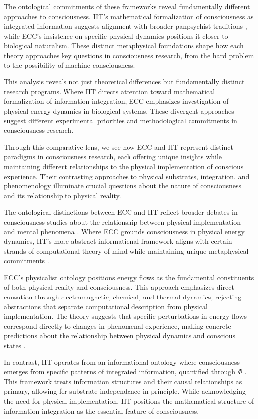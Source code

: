 \begin{refsection}
The ontological commitments of these frameworks reveal fundamentally different approaches to consciousness. IIT's mathematical formalization of consciousness as integrated information suggests alignment with broader panpsychist traditions \cite{Chalmers2015}, while ECC's insistence on specific physical dynamics positions it closer to biological naturalism. These distinct metaphysical foundations shape how each theory approaches key questions in consciousness research, from the hard problem to the possibility of machine consciousness.

This analysis reveals not just theoretical differences but fundamentally distinct research programs. Where IIT directs attention toward mathematical formalization of information integration, ECC emphasizes investigation of physical energy dynamics in biological systems. These divergent approaches suggest different experimental priorities and methodological commitments in consciousness research.

Through this comparative lens, we see how ECC and IIT represent distinct paradigms in consciousness research, each offering unique insights while maintaining different relationships to the physical implementation of conscious experience. Their contrasting approaches to physical substrates, integration, and phenomenology illuminate crucial questions about the nature of consciousness and its relationship to physical reality.

The ontological distinctions between ECC and IIT reflect broader debates in consciousness studies about the relationship between physical implementation and mental phenomena \cite{Nagel1979}. Where ECC grounds consciousness in physical energy dynamics, IIT's more abstract informational framework aligns with certain strands of computational theory of mind while maintaining unique metaphysical commitments \cite{Tononi2016}.

ECC's physicalist ontology positions energy flows as the fundamental constituents of both physical reality and consciousness. This approach emphasizes direct causation through electromagnetic, chemical, and thermal dynamics, rejecting abstractions that separate computational description from physical implementation. The theory suggests that specific perturbations in energy flows correspond directly to changes in phenomenal experience, making concrete predictions about the relationship between physical dynamics and conscious states \cite{Koch2019}.

In contrast, IIT operates from an informational ontology where consciousness emerges from specific patterns of integrated information, quantified through $\Phi$ \cite{Oizumi2014}. This framework treats information structures and their causal relationships as primary, allowing for substrate independence in principle. While acknowledging the need for physical implementation, IIT positions the mathematical structure of information integration as the essential feature of consciousness.


\end{refsection}
